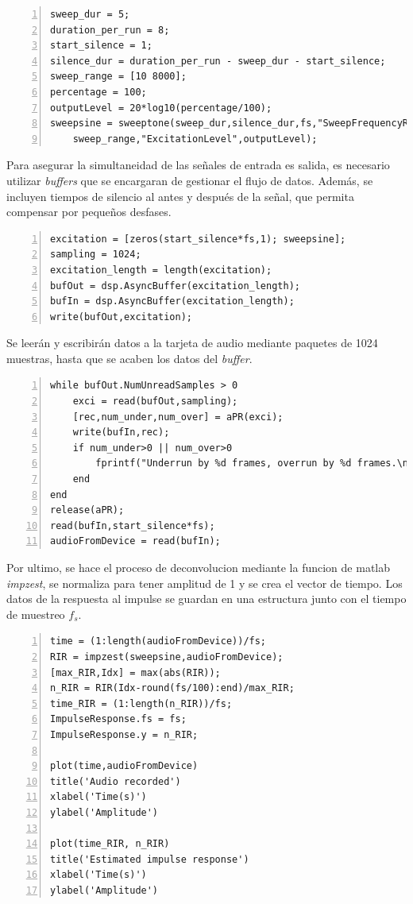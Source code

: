 \begin{lstlisting}[frame=single,numbers=left, style=Matlab-editor, basicstyle=\tiny]
sweep_dur = 5;
duration_per_run = 8;
start_silence = 1;
silence_dur = duration_per_run - sweep_dur - start_silence;
sweep_range = [10 8000];
percentage = 100;
outputLevel = 20*log10(percentage/100);
sweepsine = sweeptone(sweep_dur,silence_dur,fs,"SweepFrequencyRange", ...
    sweep_range,"ExcitationLevel",outputLevel);
\end{lstlisting}
Para asegurar la simultaneidad de las señales de entrada es salida, es necesario utilizar \textit{buffers} que se encargaran de gestionar el flujo de datos. Además, se incluyen tiempos de silencio al antes y después de la señal, que permita compensar por pequeños desfases.
\begin{lstlisting}[frame=single,numbers=left, style=Matlab-editor, basicstyle=\tiny]
excitation = [zeros(start_silence*fs,1); sweepsine];
sampling = 1024;
excitation_length = length(excitation);
bufOut = dsp.AsyncBuffer(excitation_length);
bufIn = dsp.AsyncBuffer(excitation_length);
write(bufOut,excitation);
\end{lstlisting}
Se leerán y escribirán datos a la tarjeta de audio mediante paquetes de 1024 muestras, hasta que se acaben los datos del \textit{buffer}.
\begin{lstlisting}[frame=single,numbers=left, style=Matlab-editor, basicstyle=\tiny]
while bufOut.NumUnreadSamples > 0
    exci = read(bufOut,sampling);
    [rec,num_under,num_over] = aPR(exci);
    write(bufIn,rec);
    if num_under>0 || num_over>0
        fprintf("Underrun by %d frames, overrun by %d frames.\n",num_under,num_over)
    end
end
release(aPR);
read(bufIn,start_silence*fs);
audioFromDevice = read(bufIn);
\end{lstlisting}

Por ultimo, se hace el proceso de deconvolucion mediante la funcion de matlab \textit{impzest}, se normaliza para tener amplitud de 1 y se crea el vector de tiempo. Los datos de la respuesta al impulse se guardan en una estructura junto con el tiempo de muestreo $f_{s}$.

\begin{lstlisting}[frame=single,numbers=left, style=Matlab-editor, basicstyle=\tiny]
time = (1:length(audioFromDevice))/fs;
RIR = impzest(sweepsine,audioFromDevice);
[max_RIR,Idx] = max(abs(RIR));
n_RIR = RIR(Idx-round(fs/100):end)/max_RIR;
time_RIR = (1:length(n_RIR))/fs;
ImpulseResponse.fs = fs;
ImpulseResponse.y = n_RIR;

plot(time,audioFromDevice)
title('Audio recorded')
xlabel('Time(s)')
ylabel('Amplitude')

plot(time_RIR, n_RIR)
title('Estimated impulse response')
xlabel('Time(s)')
ylabel('Amplitude')
\end{lstlisting}

